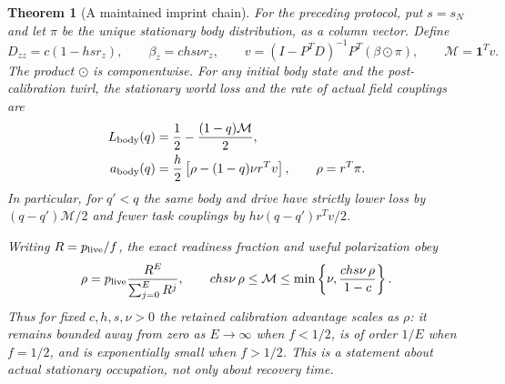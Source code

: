 \documentclass[11pt,a4paper]{article}
\newtheorem{theorem}[proposition]{Theorem}
\begin{document}
\begin{theorem}[A maintained imprint chain]\label{thm:joint-return}
For the preceding protocol, put $s=s_N$ and let $\pi$ be the unique
stationary body distribution, as a column vector. Define
\[
 D_{zz}=c(1-hs r_z),\qquad
 \beta_z=chs\nu r_z,\qquad
 v=(I-P^TD)^{-1}P^T(\beta\odot\pi),\qquad
 \mathcal M=\mathbf1^Tv.
\]
The product $\odot$ is componentwise. For any initial body state and
the post-calibration twirl, the stationary world loss and the rate
of actual field couplings are
\begin{align}
 L_{\rm body}(q)&=\frac12-\frac{(1-q)\mathcal M}{2},
 \label{eq:body-loss}\\
 a_{\rm body}(q)&=\frac h2\left[\rho-(1-q)\nu r^Tv\right],
 \qquad \rho=r^T\pi. \label{eq:body-rate}
\end{align}
In particular, for $q'<q$ the same body and drive have strictly lower
loss by $(q-q')\mathcal M/2$ and fewer task couplings by
$h\nu(q-q')r^Tv/2$.

Writing $R=p_{\rm live}/f$, the exact readiness fraction and useful
polarization obey
\begin{equation}\label{eq:body-availability}
 \rho=p_{\rm live}\frac{R^E}{\sum_{j=0}^E R^j},\qquad
 chs\nu\,\rho\le\mathcal M\le
 \min\left\{\nu,\frac{chs\nu\,\rho}{1-c}\right\}.
\end{equation}
Thus for fixed $c,h,s,\nu>0$ the retained calibration advantage scales
as $\rho$: it remains bounded away from zero as $E\to\infty$ when
$f<1/2$, is of order $1/E$ when $f=1/2$, and is exponentially small
when $f>1/2$. This is a statement about actual stationary occupation,
not only about recovery time.
\end{theorem}
\end{document}
